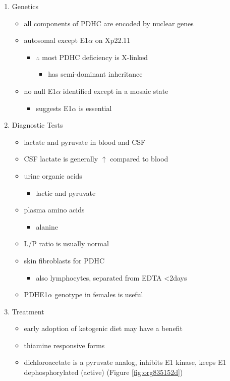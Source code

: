 \documentclass{scrartcl}
\begin{document}
\begin{enumerate}
\item Genetics
\label{sec:org0e3194c}
\begin{itemize}
\item all components of PDHC are encoded by nuclear genes
\item autosomal except E1\(\alpha\) on Xp22.11
\begin{itemize}
\item \(\therefore\) most PDHC deficiency is X-linked
\begin{itemize}
\item has semi-dominant inheritance
\end{itemize}
\end{itemize}
\item no null E1\(\alpha\) identified except in a mosaic state
\begin{itemize}
\item suggests E1\(\alpha\) is essential
\end{itemize}
\end{itemize}

\item Diagnostic Tests
\label{sec:org02a29b7}
\begin{itemize}
\item lactate and pyruvate in blood and CSF
\item CSF lactate is generally \(\uparrow\) compared to blood
\item urine organic acids
\begin{itemize}
\item lactic and pyruvate
\end{itemize}
\item plasma amino acids
\begin{itemize}
\item alanine
\end{itemize}
\item L/P ratio is usually normal
\item skin fibroblasts for PDHC
\begin{itemize}
\item also lymphocytes, separated from EDTA <2days
\end{itemize}
\item PDHE1\(\alpha\) genotype in females is useful
\end{itemize}

\item Treatment
\label{sec:org9ccf084}
\begin{itemize}
\item early adoption of ketogenic diet may have a benefit
\item thiamine responsive forms
\item dichloroacetate is a pyruvate analog, inhibits E1 kinase, keeps E1
dephosphorylated (active) (Figure \ref{fig:org835152d})
\end{itemize}


\end{enumerate}
\end{document}
